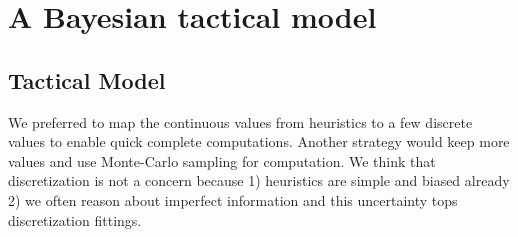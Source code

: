 \section{A Bayesian tactical model}
\label{sec:tacticalmodel}

\subsection{Tactical Model}

We preferred to map the continuous values from heuristics to a few discrete values to enable quick complete computations. Another strategy would keep more values and use Monte-Carlo sampling for computation. We think that discretization is not a concern because 1) heuristics are simple and biased already 2) we often reason about imperfect information and this uncertainty tops discretization fittings.

